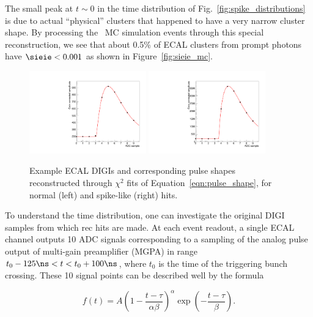 The small peak at $t\sim 0$ in the time distribution of Fig.~\ref{fig:spike_distributions} is due to actual ``physical'' clusters that happened to have a very narrow cluster shape. 
By processing the \gj\ MC simulation events through this special reconstruction, we see that about 0.5\% of ECAL clusters from prompt photons have $\sieie < 0.001$ as shown in Figure~\ref{fig:sieie_mc}.

\begin{figure}[tbp]
  \begin{center}
    \includegraphics[width=0.45\textwidth]{Reconstruction/Figures/spikes/pulse_example_normal.pdf}
    \includegraphics[width=0.45\textwidth]{Reconstruction/Figures/spikes/pulse_example_spike.pdf}
    \caption{
      Example ECAL DIGIs and corresponding pulse shapes reconstructed through $\chi^{2}$ fits of Equation~\ref{eqn:pulse_shape}, for normal (left) and spike-like (right) hits.
    }
    \label{fig:pulse_examples}
  \end{center}
\end{figure}

To understand the time distribution, one can investigate the original DIGI samples from which rec hits are made. 
At each event readout, a single ECAL channel outputs 10 ADC signals corresponding to a sampling of the analog pulse output of multi-gain preamplifier (MGPA) in range $t_{0} - 125\ns < t < t_{0} + 100\ns$, where $t_{0}$ is the time of the triggering bunch crossing. 
These 10 signal points can be described well by the formula

\begin{equation} \label{eqn:pulse_shape}
  f(t) = A \left(1 - \frac{t - \tau}{\alpha\beta}\right)^{\alpha} \exp \left(-\frac{t-\tau}{\beta}\right).
\end{equation}

